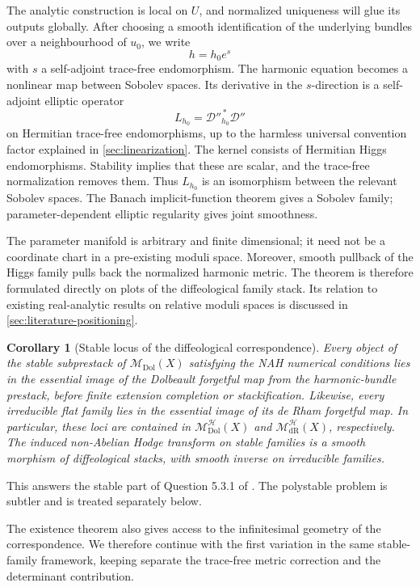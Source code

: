 \documentclass[11pt,reqno]{amsart}
\newtheorem{corollary}[theorem]{Corollary}
\theoremstyle{definition}
\theoremstyle{remark}
\newcommand{\cD}{\mathcal D}
\newcommand{\cH}{\mathcal H}
\newcommand{\Dol}{\mathrm{Dol}}
\newcommand{\dR}{\mathrm{dR}}
\newcommand{\MdiffDol}{\mathscr M_{\Dol}}
\newcommand{\MHDol}{\mathscr M^{\cH}_{\Dol}}
\newcommand{\MHdR}{\mathscr M^{\cH}_{\dR}}
\begin{document}
The analytic construction is local on $U$, and normalized uniqueness will glue its outputs globally.  After choosing a smooth identification of the underlying bundles over a neighbourhood of $u_0$, we write
\[
  h=h_0 e^s
\]
with $s$ a self-adjoint trace-free endomorphism.  The harmonic equation becomes a nonlinear map between Sobolev spaces.  Its derivative in the $s$-direction is a self-adjoint elliptic operator
\[
  L_{h_0}=\cD''^{\,*}_{h_0}\cD''
\]
on Hermitian trace-free endomorphisms, up to the harmless universal convention factor explained in \cref{sec:linearization}.  The kernel consists of Hermitian Higgs endomorphisms.  Stability implies that these are scalar, and the trace-free normalization removes them.  Thus $L_{h_0}$ is an isomorphism between the relevant Sobolev spaces.  The Banach implicit-function theorem gives a Sobolev family; parameter-dependent elliptic regularity gives joint smoothness.

The parameter manifold is arbitrary and finite dimensional; it need not be a coordinate chart in a pre-existing moduli space.  Moreover, smooth pullback of the Higgs family pulls back the normalized harmonic metric.  The theorem is therefore formulated directly on plots of the diffeological family stack.  Its relation to existing real-analytic results on relative moduli spaces is discussed in \cref{sec:literature-positioning}.

\begin{corollary}[Stable locus of the diffeological correspondence]\label{cor:intro-stable-stack}
Every object of the stable subprestack of $\MdiffDol(X)$ satisfying the NAH numerical conditions lies in the essential image of the Dolbeault forgetful map from the harmonic-bundle prestack, before finite extension completion or stackification.  Likewise, every irreducible flat family lies in the essential image of its de Rham forgetful map.  In particular, these loci are contained in $\MHDol(X)$ and $\MHdR(X)$, respectively.  The induced non-Abelian Hodge transform on stable families is a smooth morphism of diffeological stacks, with smooth inverse on irreducible families.
\end{corollary}

This answers the stable part of Question 5.3.1 of \cite{AzamRayan2026}.  The polystable problem is subtler and is treated separately below.


The existence theorem also gives access to the infinitesimal geometry of the correspondence.  We therefore continue with the first variation in the same stable-family framework, keeping separate the trace-free metric correction and the determinant contribution.
\end{document}
